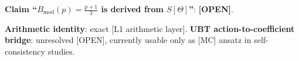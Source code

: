 \documentclass[12pt,a4paper]{article}
\begin{document}
\begin{statusbox}
\textbf{Claim ``\(B_{\mathrm{mod}}(p)=\frac{p+1}{3}\) is derived from \(S[\Theta]\)''}:
\textbf{[OPEN]}.

\textbf{Arithmetic identity}: exact [L1 arithmetic layer].  
\textbf{UBT action-to-coefficient bridge}: unresolved [OPEN], currently usable only
as [MC] ansatz in self-consistency studies.
\end{statusbox}

\ifdefined\INCLUDEMODE
\else
  
\end{document}
